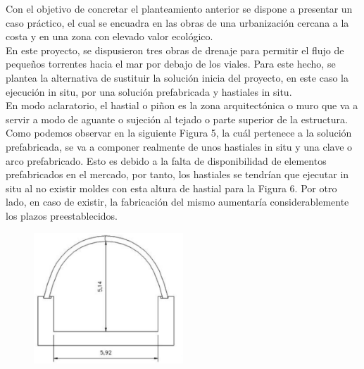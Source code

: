\documentclass[10pt]{article}
\begin{document}
Con el objetivo de concretar el planteamiento anterior se dispone a presentar un caso práctico, el cual se encuadra en las obras de una urbanización cercana a la costa y en una zona con elevado valor ecológico.\\

En este proyecto, se dispusieron tres obras de drenaje para permitir el flujo de pequeños torrentes hacia el mar por debajo de los viales. Para este hecho, se plantea la alternativa de sustituir la solución inicia del proyecto, en este caso la ejecución in situ, por una solución prefabricada y hastiales in situ.\\

En modo aclaratorio, el hastial o piñon es la zona arquitectónica o muro que va a servir a modo de aguante o sujeción al tejado o parte superior de la estructura. \\

Como podemos observar en la siguiente Figura 5, la cuál pertenece a la solución prefabricada, se va a componer realmente de unos hastiales in situ y una clave o arco prefabricado. Esto es debido a la falta de disponibilidad de elementos prefabricados en el mercado, por tanto, los hastiales se tendrían que ejecutar in situ al no existir moldes con esta altura de hastial para la Figura 6. Por otro lado, en caso de existir, la fabricación del mismo aumentaría considerablemente los plazos preestablecidos.

\begin{figure}[H]
	\begin{center}
 		\includegraphics[width = 0.5\textwidth]{Imagenes/img1.eps}
	\end{center} 
\end{figure}
\end{document}
